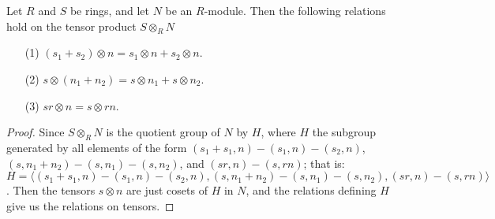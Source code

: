 \begin{lemma}\label{4.4.1}
    Let $R$ and $S$ be rings, and let $N$ be an $R$-module. Then the following
    relations hold on the tensor product $S \otimes_R N$
    \begin{enumerate}
        \item[(1)] $(s_1+s_2) \otimes n=s_1 \otimes n+s_2 \otimes n$.

        \item[(2)] $s \otimes (n_1+n_2)=s \otimes n_1+s \otimes n_2$.

        \item[(3)] $sr \otimes n=s \otimes rn$.
    \end{enumerate}
\end{lemma}
\begin{proof}
    Since $S \otimes_R N$ is the quotient group of $N$ by $H$, where $H$ the
    subgroup generated by all elements of the form $(s_1+s_1,n)-(s_1,n)-(s_2,n)$,
    $(s,n_1+n_2)-(s,n_1)-(s,n_2)$, and $(sr,n)-(s,rn)$; that is: $H=\langle
    (s_1+s_1,n)-(s_1,n)-(s_2,n), (s,n_1+n_2)-(s,n_1)-(s,n_2), (sr,n)-(s,rn)
    \rangle$. Then the tensors $s \otimes n$ are just cosets of $H$ in $N$, and
    the relations defining $H$ give us the relations on tensors.
\end{proof}

